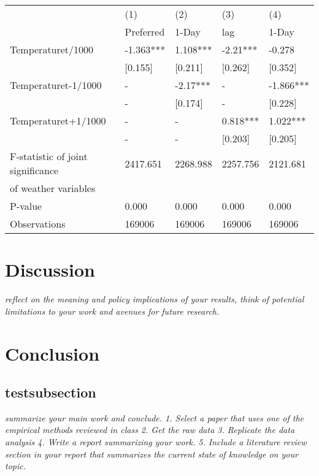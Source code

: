 \documentclass[11pt]{article}
\begin{document}
	\begin{center}
	\begin{tabular}{lllll}
		\toprule
		{} &        (1) &       (2) &       (3) &        (4) \\
		&  Preferred &     1-Day &       lag &      1-Day \\
		\midrule
		Temperaturet/1000                 &  -1.363*** &  1.108*** &  -2.21*** &     -0.278 \\
		&    [0.155] &   [0.211] &   [0.262] &    [0.352] \\
		Temperaturet-1/1000               &          - &  -2.17*** &         - &  -1.866*** \\
		&          - &   [0.174] &         - &    [0.228] \\
		Temperaturet+1/1000               &          - &         - &  0.818*** &   1.022*** \\
		&            - &            - &      [0.203] &      [0.205] \\
		F-statistic of joint significance &   2417.651 &  2268.988 &  2257.756 &   2121.681 \\
		of weather variables              &            &           &           &            \\
		P-value                           &      0.000 &     0.000 &     0.000 &      0.000 \\
		\midrule
		Observations                      &     169006 &    169006 &    169006 &     169006 \\
		\bottomrule
	\end{tabular}
	\end{center}
	
	\section{Discussion}
	\textit{reflect on the meaning and policy implications of your results, think of potential limitations to your work and avenues for future research.}
	\section{ Conclusion}
	\subsection{testsubsection}
	\textit{	summarize your main work and conclude.
		1. Select a paper that uses one of the empirical methods reviewed in class
		2. Get the raw data
		3. Replicate the data analysis
		4. Write a report summarizing your work.
		5. Include a literature review section in your report that summarizes the current state
		of knowledge on your topic.
	}
\end{document}
